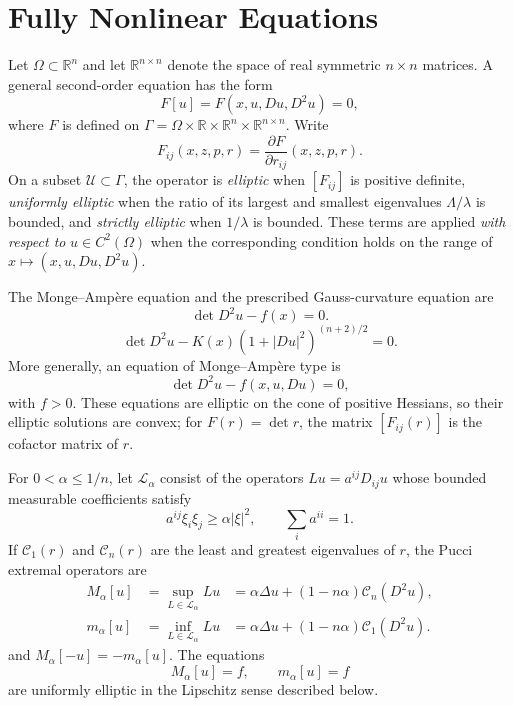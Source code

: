 \chapter{Fully Nonlinear Equations}

Let $\Omega\subset\mathbb R^n$ and let $\mathbb R^{n\times n}$ denote the
space of real symmetric $n\times n$ matrices.  A general second-order equation
has the form
\begin{equation}\tag{17.1}
F[u]=F(x,u,Du,D^2u)=0,
\end{equation}
where $F$ is defined on
$\Gamma=\Omega\times\mathbb R\times\mathbb R^n\times\mathbb R^{n\times n}$.
Write
\[
F_{ij}(x,z,p,r)=\frac{\partial F}{\partial r_{ij}}(x,z,p,r).
\]
On a subset $\mathcal U\subset\Gamma$, the operator is \emph{elliptic} when
$[F_{ij}]$ is positive definite, \emph{uniformly elliptic} when the ratio of
its largest and smallest eigenvalues $\Lambda/\lambda$ is bounded, and
\emph{strictly elliptic} when $1/\lambda$ is bounded.  These terms are applied
\emph{with respect to} $u\in C^2(\Omega)$ when the corresponding condition
holds on the range of $x\mapsto(x,u,Du,D^2u)$.

The Monge--Amp\`ere equation and the prescribed Gauss-curvature equation are
\begin{equation}
\det D^2u-f(x)=0.
\tag{17.2}
\end{equation}
\begin{equation}
\det D^2u-K(x)(1+|Du|^2)^{(n+2)/2}=0.
\tag{17.3}
\end{equation}
More generally, an equation of Monge--Amp\`ere type is
\begin{equation}\tag{17.4}
\det D^2u-f(x,u,Du)=0,
\end{equation}
with $f>0$.  These equations are elliptic on the cone of positive Hessians,
so their elliptic solutions are convex; for $F(r)=\det r$, the matrix
$[F_{ij}(r)]$ is the cofactor matrix of $r$.

For $0<\alpha\le 1/n$, let $\mathcal L_\alpha$ consist of the operators
$Lu=a^{ij}D_{ij}u$ whose bounded measurable coefficients satisfy
\[
a^{ij}\xi_i\xi_j\ge\alpha|\xi|^2,
\qquad \sum_i a^{ii}=1.
\]
If $\mathcal C_1(r)$ and $\mathcal C_n(r)$ are the least and greatest
eigenvalues of $r$, the Pucci extremal operators are
\begin{equation}
\tag{17.5}
\begin{aligned}
M_\alpha[u]&=\sup_{L\in\mathcal L_\alpha}Lu
&=\alpha\Delta u+(1-n\alpha)\mathcal C_n(D^2u),\\
m_\alpha[u]&=\inf_{L\in\mathcal L_\alpha}Lu
&=\alpha\Delta u+(1-n\alpha)\mathcal C_1(D^2u).
\end{aligned}
\end{equation}
and $M_\alpha[-u]=-m_\alpha[u]$.  The equations
\begin{equation}\tag{17.6}
M_\alpha[u]=f,
\qquad m_\alpha[u]=f
\end{equation}
are uniformly elliptic in the Lipschitz sense described below.

